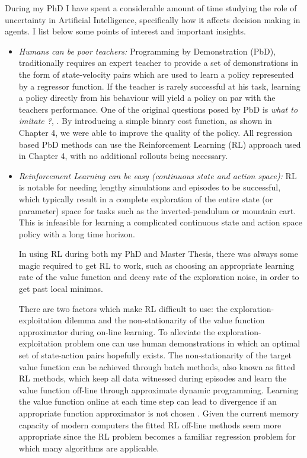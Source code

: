 During my PhD I have spent a considerable amount of time studying the role 
of uncertainty in Artificial Intelligence, specifically how it affects 
decision making in agents. I list below some points of interest and important 
insights.

\begin{itemize}

 \item \textit{Humans can be poor teachers:}  Programming by Demonstration (PbD), traditionally requires an expert 
 teacher to provide a set of demonstrations in the form of state-velocity pairs which are used to learn 
 a policy represented by a regressor function. If the teacher is rarely successful at his task, learning a policy
 directly from his behaviour will yield a policy on par with the teachers performance.
 One of the original questions posed by PbD is \textit{what to imitate ?}, \cite{Billard08chapter}.
 By introducing a simple binary cost function, as shown in Chapter 4, we were able to improve the quality of the policy.
 All regression based PbD methods can use the Reinforcement Learning (RL) approach used in Chapter 4, with no additional 
 rollouts being necessary.
 
 \item \textit{Reinforcement Learning can be easy (continuous state and action space):} 
 RL is notable for needing lengthy simulations and episodes to be successful, which typically result in 
 a complete exploration of the entire state (or parameter) space for tasks
 such as the inverted-pendulum or mountain cart.  This is infeasible for learning a  complicated continuous state 
 and action space policy with a long time horizon.
 
 In using RL during both my PhD and Master Thesis, there was always some magic required
 to get RL to work, such as choosing an appropriate learning rate of the value function 
 and decay rate of the exploration noise, in order to get past local minimas. 
 
 There are two factors which make RL difficult to use: the exploration-exploitation 
 dilemma and the non-stationarity of the value function approximator during on-line learning.
 To alleviate the exploration-exploitation problem one can use human demonstrations 
 in which an optimal set of state-action pairs hopefully exists. The non-stationarity
 of the target value function can be achieved through batch methods, also known as fitted RL methods, which 
 keep all data witnessed during episodes and learn the value function off-line through 
 approximate dynamic programming. 
 Learning the value function online at each time step can lead to divergence if an appropriate 
 function approximator is not chosen \cite[p. 51]{RL_book_2010}. Given the current memory capacity 
 of modern computers the fitted RL off-line methods seem more appropriate since the RL problem
 becomes a familiar regression problem for which many algorithms are applicable.
 

\end{itemize}
